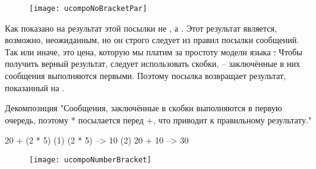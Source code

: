 \documentclass[a4paper,10pt,twoside]{book}
\begin{document}
\begin{figure}
\begin{center}\texttt{[image: ucompoNoBracketPar]}\end{center}
\end{figure}
\noindent
Как показано на  результат этой посылки не , а . Этот результат является, возможно, неожиданным, но он строго следует из правил посылки сообщений. Так или иначе, это цена, которую мы платим за простоту модели языка \st. Чтобы получить верный результат, следует использовать скобки, -- заключённые в них сообщения выполняются первыми. Поэтому посылка  возвращает результат, показанный на .

\begin{example}[mathcorrect]{Декомпозиция }{}
"Сообщения, заключённые в скобки выполняются в первую очередь, поэтому * посылается перед +, что приводит к правильному результату."

    20 + (2 * 5) 
(1)        (2 * 5) --> 10
(2) 20 + 10      --> 30
\end{example}

\begin{figure}
\begin{center}
\texttt{[image: ucompoNumberBracket]}
\end{center}
\end{figure}


\end{document}
